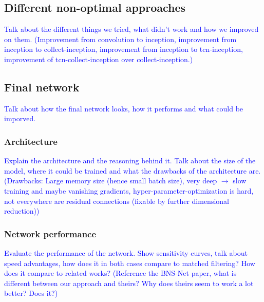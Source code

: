 \subsection{Different non-optimal approaches}
\textcolor{blue}{Talk about the different things we tried, what didn't work and how we improved on them. (Improvement from convolution to inception, improvement from inception to collect-inception, improvement from inception to tcn-inception, improvement of tcn-collect-inception over collect-inception.)}
\subsection{Final network}
\textcolor{blue}{Talk about how the final network looks, how it performs and what could be imporved.}
\subsubsection{Architecture}
\textcolor{blue}{Explain the architecture and the reasoning behind it. Talk about the size of the model, where it could be trained and what the drawbacks of the architecture are. (Drawbacks: Large memory size (hence small batch size), very deep $\to$ slow training and maybe vanishing gradients, hyper-parameter-optimization is hard, not everywhere are residual connections (fixable by further dimensional reduction))}
\subsubsection{Network performance}
\textcolor{blue}{Evaluate the performance of the network. Show sensitivity curves, talk about speed advantages, how does it in both cases compare to matched filtering? How does it compare to related works? (Reference the BNS-Net paper, what is different between our approach and theirs? Why does theirs seem to work a lot better? Does it?)}
